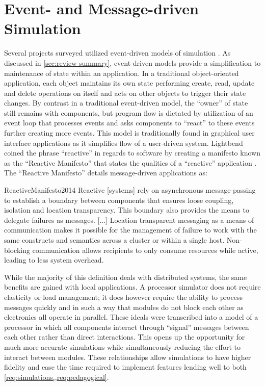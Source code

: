 \section{Event- and Message-driven Simulation}

Several projects surveyed utilized event-driven models of simulation \cite{Nakamura2013, McLoughlin2010, Garcia2009}. As discussed in \cref{sec:review-summary}, event-driven models provide a simplification to maintenance of state within an application. In a traditional object-oriented application, each object maintains its own state performing create, read, update and delete operations on itself and acts on other objects to trigger their state changes. By contrast in a traditional event-driven model, the ``owner'' of state still remains with components, but program flow is dictated by utilization of an event loop that processes events and asks components to ``react'' to these events further creating more events. This model is traditionally found in graphical user interface applications as it simplifies flow of a user-driven system. Lightbend coined the phrase ``reactive'' in regards to software by creating a manifesto known as the ``Reactive Manifesto'' that states the qualities of a ``reactive'' application \cite{ReactiveManifesto2014}. The ``Reactive Manifesto'' details message-driven applications as: 
\begin{displaycquote}{ReactiveManifesto2014}
    Reactive [systems] rely on asynchronous message-passing to establish a boundary between components that ensures loose coupling, isolation and location transparency. This boundary also provides the means to delegate failures as messages. [...] Location transparent messaging as a means of communication makes it possible for the management of failure to work with the same constructs and semantics across a cluster or within a single host. Non-blocking communication allows recipients to only consume resources while active, leading to less system overhead.
\end{displaycquote}
While the majority of this definition deals with distributed systems, the same benefits are gained with local applications. A processor simulator does not require elasticity or load management; it does however require the ability to process messages quickly and in such a way that modules do not block each other as electronics all operate in parallel. These ideals were transcribed into a model of a processor in which all components interact through ``signal'' messages between each other rather than direct interactions. This opens up the opportunity for much more accurate simulations while simultaneously reducing the effort to interact between modules. These relationships allow simulations to have higher fidelity and ease the time required to implement features lending well to both \cref{req:simulations,,req:pedagogical}. 

